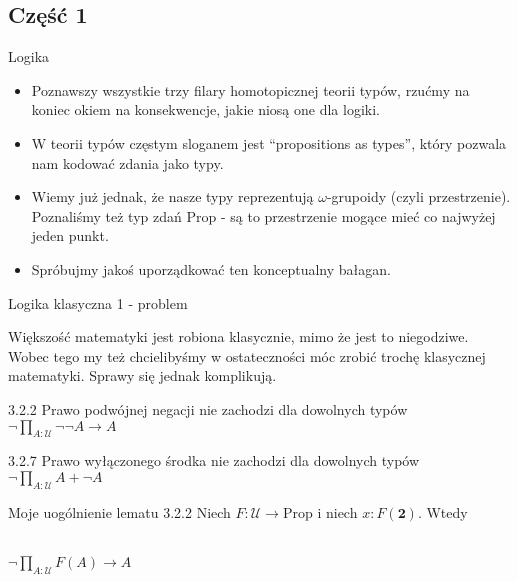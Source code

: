 \documentclass{beamer}
\newcommand{\U}{\mathcal{U}}
\newcommand{\Prop}{\text{Prop}}
\begin{document}
\subsection{Część 1}

\begin{frame}{Logika}
\begin{itemize}
	\item Poznawszy wszystkie trzy filary homotopicznej teorii typów, rzućmy na koniec okiem na konsekwencje, jakie niosą one dla logiki.
	\item W teorii typów częstym sloganem jest ``propositions as types'', który pozwala nam kodować zdania jako typy.
	\item Wiemy już jednak, że nasze typy reprezentują $\omega$-grupoidy (czyli przestrzenie). Poznaliśmy też typ zdań $\Prop$ - są to przestrzenie mogące mieć co najwyżej jeden punkt.
	\item Spróbujmy jakoś uporządkować ten konceptualny bałagan.
\end{itemize}
\end{frame}

\begin{frame}{Logika klasyczna 1 - problem}

Większość matematyki jest robiona klasycznie, mimo że jest to niegodziwe. Wobec tego my też chcielibyśmy w ostateczności móc zrobić trochę klasycznej matematyki. Sprawy się jednak komplikują.

\begin{block}{3.2.2 Prawo podwójnej negacji nie zachodzi dla dowolnych typów}
$\neg \prod_{A : \U} \neg\neg A \to A$
\end{block}

\begin{block}{3.2.7 Prawo wyłączonego środka nie zachodzi dla dowolnych typów}
$\neg \prod_{A : \U} A + \neg A$
\end{block}

\begin{block}{Moje uogólnienie lematu 3.2.2}
Niech $F : \U \to \Prop$ i niech $x : F(\textbf{2})$. Wtedy \\~\

$\neg \prod_{A : \U} F(A) \to A$
\end{block}

\end{frame}
\end{document}
